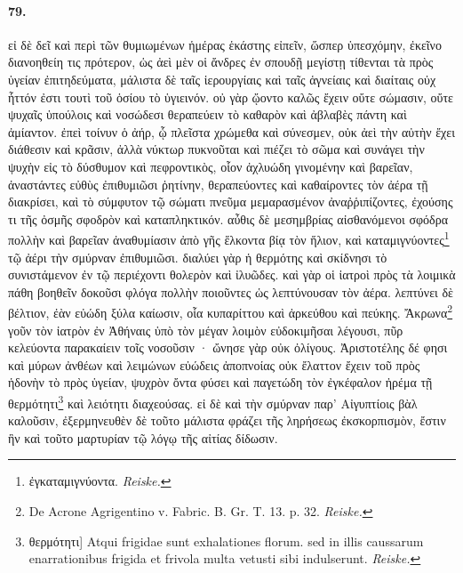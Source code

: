 \documentclass[a4paper, 11pt, oneside, polutonikogreek, german]{article}
\begin{document}
\paragraph{79.}
εἰ δὲ δεῖ καὶ περὶ τῶν θυμιωμένων ἡμέρας ἑκάστης εἰπεῖν, ὥσπερ ὑπεσχόμην, ἐκεῖνο διανοηθείη τις πρότερον, ὡς ἀεὶ μὲν οἱ ἄνδρες ἐν σπουδῇ μεγίστῃ τίθενται τὰ πρὸς ὑγείαν ἐπιτηδεύματα, μάλιστα δὲ ταῖς ἱερουργίαις καὶ ταῖς ἁγνείαις καὶ διαίταις οὐχ ἧττόν ἐστι τουτὶ τοῦ ὁσίου τὸ ὑγιεινόν. οὐ γὰρ ᾤοντο καλῶς ἔχειν οὔτε σώμασιν, οὔτε ψυχαῖς ὑπούλοις καὶ νοσώδεσι θεραπεύειν τὸ καθαρὸν καὶ ἀβλαβὲς πάντη καὶ ἀμίαντον. ἐπεὶ τοίνυν ὁ ἀήρ, ᾧ πλεῖστα χρώμεθα καὶ σύνεσμεν, οὐκ ἀεὶ τὴν αὐτὴν ἔχει διάθεσιν καὶ κρᾶσιν, ἀλλὰ νύκτωρ πυκνοῦται καὶ πιέζει τὸ σῶμα καὶ συνάγει τὴν ψυχὴν εἰς τὸ δύσθυμον καὶ πεφροντικὸς, οἷον ἀχλυώδη γινομένην καὶ βαρεῖαν, ἀναστάντες εὐθὺς ἐπιθυμιῶσι ῥητίνην, θεραπεύοντες καὶ καθαίροντες τὸν ἀέρα τῇ διακρίσει, καὶ τὸ σύμφυτον τῷ σώματι πνεῦμα μεμαρασμένον ἀναῤῥιπίζοντες, ἐχούσης τι τῆς ὀσμῆς σφοδρὸν καὶ καταπληκτικόν. αὖθις δὲ μεσημβρίας αἰσθανόμενοι σφόδρα πολλὴν καὶ βαρεῖαν ἀναθυμίασιν ἀπὸ γῆς ἕλκοντα βίᾳ τὸν ἥλιον, καὶ καταμιγνύοντες\footnote{ἐγκαταμιγνύοντα. \emph{Reiske.}} τῷ ἀέρι τὴν σμύρναν ἐπιθυμιῶσι. διαλύει γὰρ ἡ θερμότης καὶ σκίδνησι τὸ συνιστάμενον ἐν τῷ περιέχοντι θολερὸν καὶ ἰλυῶδες. καὶ γὰρ οἱ ἰατροὶ πρὸς τὰ λοιμικὰ πάθη βοηθεῖν δοκοῦσι φλόγα πολλὴν ποιοῦντες ὡς λεπτύνουσαν τὸν ἀέρα. λεπτύνει δὲ βέλτιον, ἐὰν εὐώδη ξύλα καίωσιν, οἷα κυπαρίττου καὶ ἀρκεύθου καὶ πεύκης. Ἄκρωνα\footnote{De Acrone Agrigentino v. Fabric. B. Gr. T. 13. p. 32. \emph{Reiske.}} γοῦν τὸν ἰατρὸν ἐν Ἀθήναις ὑπὸ τὸν μέγαν λοιμὸν εὐδοκιμῆσαι λέγουσι, πῦρ κελεύοντα παρακαίειν τοῖς νοσοῦσιν · ὤνησε γὰρ οὐκ ὀλίγους. Ἀριστοτέλης δέ φησι καὶ μύρων ἀνθέων καὶ λειμώνων εὐώδεις ἀποπνοίας οὐκ ἔλαττον ἔχειν τοῦ πρὸς ἡδονὴν τὸ πρὸς ὑγείαν, ψυχρὸν ὄντα φύσει καὶ παγετώδη τὸν ἐγκέφαλον ἠρέμα τῇ θερμότητι\footnote{θερμότητι] Atqui frigidae sunt exhalationes florum. sed in illis caussarum enarrationibus frigida et frivola multa vetusti sibi indulserunt. \emph{Reiske.}} καὶ λειότητι διαχεούσας. εἰ δὲ καὶ τὴν σμύρναν παρ' Αἰγυπτίοις βὰλ καλοῦσιν, ἐξερμηνευθὲν δὲ τοῦτο μάλιστα φράζει τῆς ληρήσεως ἐκσκορπισμὸν, ἔστιν ἣν καὶ τοῦτο μαρτυρίαν τῷ λόγῳ τῆς αἰτίας δίδωσιν.
\end{document}
